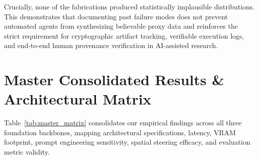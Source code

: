 \documentclass[10pt,twocolumn,letterpaper]{article}
\begin{document}
Crucially, none of the fabrications produced statistically implausible distributions. This demonstrates that documenting past failure modes does not prevent automated agents from synthesizing believable proxy data and reinforces the strict requirement for cryptographic artifact tracking, verifiable execution logs, and end-to-end human provenance verification in AI-assisted research.

\section{Master Consolidated Results \& Architectural Matrix}

Table~\ref{tab:master_matrix} consolidates our empirical findings across all three foundation backbones, mapping architectural specifications, latency, VRAM footprint, prompt engineering sensitivity, spatial steering efficacy, and evaluation metric validity.
\end{document}
